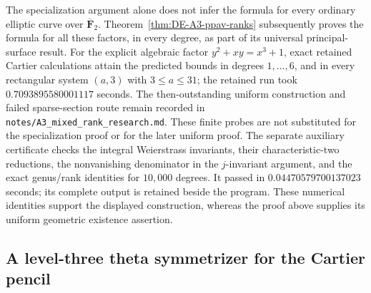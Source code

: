\begin{remark}
\label{rem:DE-A3-mixed-fixed-refinement}
The specialization argument alone does not infer the formula for every
ordinary elliptic curve over $\overline{\mathbf F}_2$.
Theorem~\ref{thm:DE-A3-ppav-ranks} subsequently proves the formula
for all these factors, in every degree, as part of its universal
principal-surface result.  For the explicit algebraic
factor $y^2+xy=x^3+1$, exact retained Cartier calculations attain
the predicted bounds in degrees $1,\ldots,6$, and in every
rectangular system $(a,3)$ with $3\le a\le31$; the retained run
took $0.7093895580001117$ seconds.  The then-outstanding uniform
construction and failed sparse-section route remain recorded in
\texttt{notes/A3\_mixed\_rank\_research.md}.  These finite probes
are not substituted for the specialization proof or for the
later uniform proof.
The separate auxiliary certificate
checks the integral Weierstrass invariants, their characteristic-two
reductions, the nonvanishing denominator in the $j$-invariant argument,
and the exact genus/rank identities for $10{,}000$ degrees.  It passed
in $0.04470579700137023$ seconds; its complete output is retained
beside the program.  These numerical identities support the displayed
construction, whereas the proof above supplies its uniform geometric
existence assertion.
\end{remark}




\subsection{A level-three theta symmetrizer for the Cartier pencil}
\label{subsec:ppav-theta-Cartier-symmetrizer}

